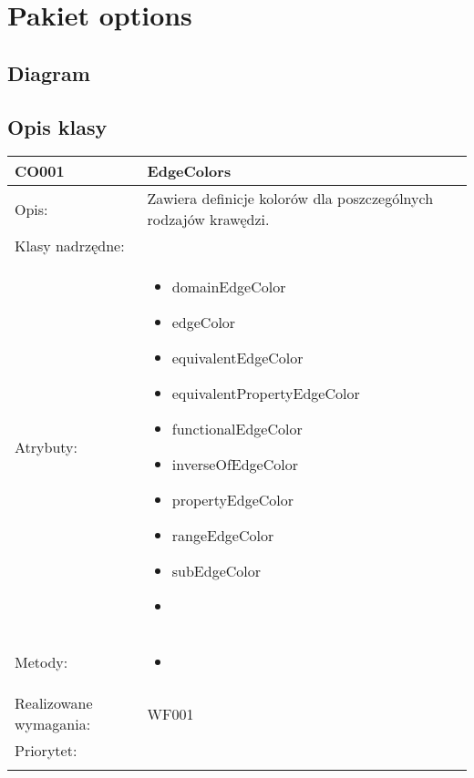 \documentclass[a4paper,10pt]{article}
\begin{document}
\section{Pakiet options}

\subsection{Diagram}

\subsection{Opis klasy}

\begin{center}
 


\begin{tabular}{|m{3cm}|m{9cm}|} \hline

CO001 & EdgeColors \\ \hline
Opis: & Zawiera definicje kolorów dla poszczególnych rodzajów krawędzi.   \\ \hline
Klasy nadrzędne: &     \\ \hline
Atrybuty: & \begin{itemize}
 \item domainEdgeColor
 \item edgeColor
 \item equivalentEdgeColor
 \item equivalentPropertyEdgeColor
 \item functionalEdgeColor
 \item inverseOfEdgeColor
 \item propertyEdgeColor
 \item rangeEdgeColor
 \item subEdgeColor
 \item 
\end{itemize}
 \\ \hline
Metody: & \begin{itemize}
 \item 
\end{itemize}
  \\ \hline
Realizowane wymagania: & WF001 \\ \hline
Priorytet: &  \\ \hline

\multicolumn{2}{c}{} \\
 \hline


\end{tabular}
\end{center}
\end{document}
